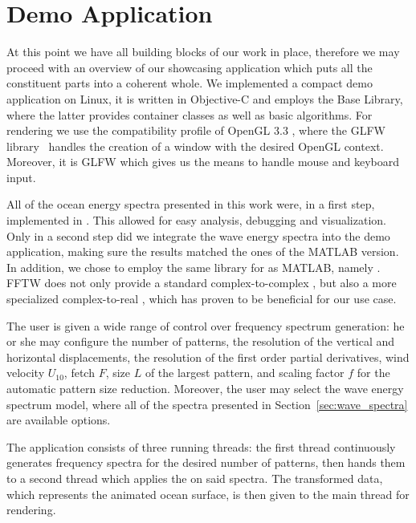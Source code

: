 \section{Demo Application}
\label{sec:demo_application}
At this point we have all building blocks of our work in place, therefore we
may proceed with an overview of our showcasing application which puts
all the constituent parts into a coherent whole. We implemented a compact demo
application on Linux, it is written in Objective-C and employs the
\citet{misc:gnustep} Base Library, where the latter provides container classes
as well as basic algorithms.
For rendering we use the compatibility profile of OpenGL 3.3 \citep{misc:opengl,misc:opengl33},
where the GLFW library~\citep{misc:glfw}
handles the creation of a window with the desired OpenGL context. Moreover,
it is GLFW which gives us the means to handle mouse and keyboard input.

All of the ocean energy spectra presented in this work were, in a first step,
implemented in \citet{misc:matlab}. This allowed for easy analysis,
debugging and visualization. Only in a second step did we integrate the wave
energy spectra into the demo application, making sure the results matched the
ones of the MATLAB version. In addition, we chose to employ the same library for
\FastFourierTransforms as MATLAB, namely \citet{misc:fftw}. FFTW does
not only provide a standard complex-to-complex \DFT, but also a more specialized
complex-to-real \DFT, which has proven to be beneficial for our use case.

The user is given a wide range of control over frequency spectrum generation:
he or she may configure the number of patterns, the resolution of the vertical
and horizontal displacements, the resolution of the first order partial
derivatives, wind velocity $U_{10}$, fetch $F$, size $L$ of the largest pattern,
and scaling factor $f$ for the automatic pattern size reduction.
Moreover, the user may select the wave energy spectrum model, where all
of the spectra presented in Section~\ref{sec:wave_spectra} are available
options.

The application consists of three running threads: the first thread continuously
generates frequency spectra for the desired number of patterns, then hands them
to a second thread which applies the \IDFT on said spectra. The transformed
data, which represents the animated ocean surface, is then given to the main
thread for rendering.
%
